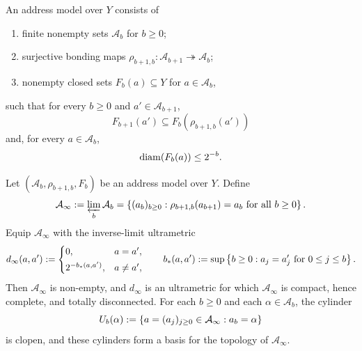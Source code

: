\begin{definition}
\label{def:address-model}
An address model over \(Y\) consists of
\begin{enumerate}[label=(\roman*)]
  \item finite nonempty sets \(\mathcal{A}_b\) for \(b\geq 0\);
  \item surjective bonding maps
    \(\rho_{b+1,b}:\mathcal{A}_{b+1}\twoheadrightarrow\mathcal{A}_b\);
  \item nonempty closed sets \(F_b(a)\subseteq Y\) for \(a\in\mathcal{A}_b\),
\end{enumerate}
such that for every \(b\geq 0\) and \(a'\in\mathcal{A}_{b+1}\),
\[
  F_{b+1}(a')\subseteq F_b(\rho_{b+1,b}(a'))
\]
and, for every \(a\in\mathcal{A}_b\),
\[
  \operatorname{diam}(F_b(a))\leq 2^{-b}.
\]
\end{definition}

\begin{proposition}
\label{prop:inverse-limit-space}
Let \((\mathcal{A}_b,\rho_{b+1,b},F_b)\) be an address model over \(Y\).
Define
\[
  \mathcal{A}_\infty
  := \varprojlim_b \mathcal{A}_b
  = \left\{(a_b)_{b\geq 0}:
      \rho_{b+1,b}(a_{b+1})=a_b \text{ for all } b\geq 0 \right\}.
\]
Equip \(\mathcal{A}_\infty\) with the inverse-limit ultrametric
\[
  d_\infty(a,a')
  :=
  \begin{cases}
    0, & a=a',\\[1mm]
    2^{-b_\ast(a,a')}, & a\neq a',
  \end{cases}
  \qquad
  b_\ast(a,a')
  := \sup\left\{b\geq 0: a_j=a'_j\text{ for }0\leq j\leq b \right\}.
\]
Then \(\mathcal{A}_\infty\) is non-empty, and \(d_\infty\) is an
ultrametric for which \(\mathcal{A}_\infty\) is compact, hence
complete, and totally disconnected.  For each \(b\geq 0\) and each
\(\alpha\in\mathcal{A}_b\), the cylinder
\[
  U_b(\alpha)
  := \left\{a=(a_j)_{j\geq 0}\in\mathcal{A}_\infty:a_b=\alpha\right\}
\]
is clopen, and these cylinders form a basis for the topology of
\(\mathcal{A}_\infty\).
\end{proposition}

